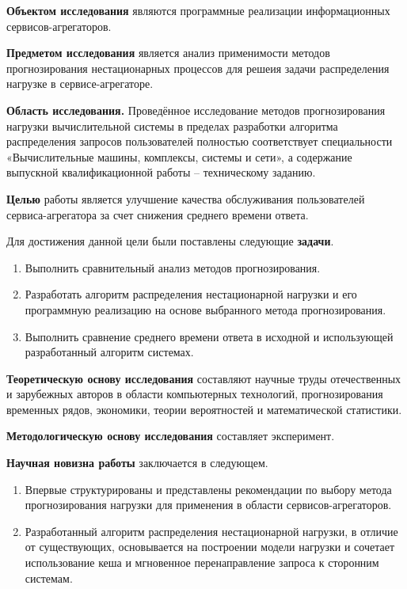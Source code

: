 {\bfseries Объектом исследования} являются программные реализации информационных
сервисов-агрегаторов.

{\bfseries Предметом исследования} является анализ применимости методов
прогнозирования нестационарных процессов для решеия задачи распределения
нагрузке в сервисе-агрегаторе.

{\bfseries Область исследования.} Проведённое исследование методов 
прогнозирования нагрузки вычислительной системы в пределах разработки 
алгоритма распределения запросов пользователей полностью соответствует 
специальности «Вычислительные машины, комплексы, системы и сети», а 
содержание выпускной квалификационной работы -- техническому
заданию.

{\bfseries Целью} работы является улучшение 
качества обслуживания пользователей сервиса-агрегатора за счет снижения 
среднего времени ответа.

Для достижения данной цели были поставлены следующие \textbf{задачи}.
\begin{enumerate}
	\item Выполнить сравнительный анализ методов прогнозирования.
	\item Разработать алгоритм распределения нестационарной нагрузки и его 
		программную реализацию на основе выбранного метода 
		прогнозирования.
	\item Выполнить сравнение среднего времени ответа в исходной и 
		использующей разработанный алгоритм системах.
\end{enumerate}

{\bfseries Теоретическую основу исследования} составляют научные труды
отечественных и зарубежных авторов в области компьютерных технологий,
прогнозирования временных рядов, экономики, теории вероятностей и
математической статистики.

{\bfseries Методологическую основу исследования} составляет эксперимент.

{\bfseries Научная новизна работы} заключается в следующем.
\begin{enumerate}
   \item Впервые структурированы и представлены рекомендации по выбору метода
      прогнозирования нагрузки для применения в области сервисов-агрегаторов.
   \item Разработанный алгоритм распределения нестационарной нагрузки,
      в отличие от существующих, основывается на построении модели нагрузки
      и сочетает использование кеша и мгновенное перенаправление запроса к
      сторонним системам.
\end{enumerate}

